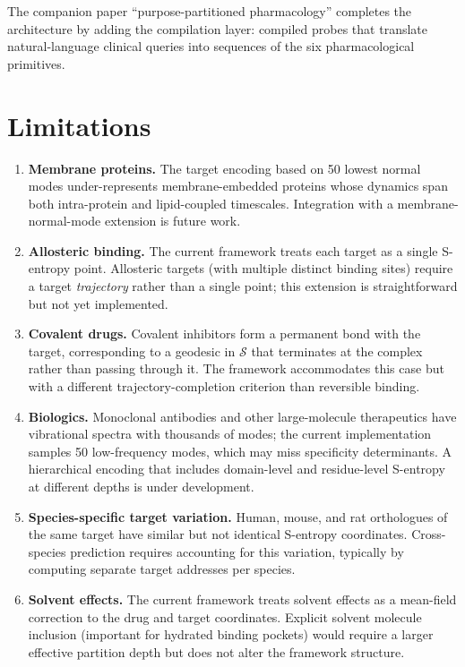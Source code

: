 \documentclass[11pt,twocolumn,a4paper]{article}
\theoremstyle{definition}
\theoremstyle{remark}
\newcommand{\Sspace}{\mathcal{S}}
\begin{document}
The companion paper ``purpose-partitioned pharmacology'' \citep{sachikonye2025g} completes the architecture by adding the compilation layer: compiled probes that translate natural-language clinical queries into sequences of the six pharmacological primitives.

\section{Limitations}
\label{sec:limitations}

\begin{enumerate}[nosep,leftmargin=*]
\item \textbf{Membrane proteins.} The target encoding based on 50 lowest normal modes under-represents membrane-embedded proteins whose dynamics span both intra-protein and lipid-coupled timescales. Integration with a membrane-normal-mode extension is future work.

\item \textbf{Allosteric binding.} The current framework treats each target as a single S-entropy point. Allosteric targets (with multiple distinct binding sites) require a target \emph{trajectory} rather than a single point; this extension is straightforward but not yet implemented.

\item \textbf{Covalent drugs.} Covalent inhibitors form a permanent bond with the target, corresponding to a geodesic in $\Sspace$ that terminates at the complex rather than passing through it. The framework accommodates this case but with a different trajectory-completion criterion than reversible binding.

\item \textbf{Biologics.} Monoclonal antibodies and other large-molecule therapeutics have vibrational spectra with thousands of modes; the current implementation samples 50 low-frequency modes, which may miss specificity determinants. A hierarchical encoding that includes domain-level and residue-level S-entropy at different depths is under development.

\item \textbf{Species-specific target variation.} Human, mouse, and rat orthologues of the same target have similar but not identical S-entropy coordinates. Cross-species prediction requires accounting for this variation, typically by computing separate target addresses per species.

\item \textbf{Solvent effects.} The current framework treats solvent effects as a mean-field correction to the drug and target coordinates. Explicit solvent molecule inclusion (important for hydrated binding pockets) would require a larger effective partition depth but does not alter the framework structure.
\end{enumerate}
\end{document}
